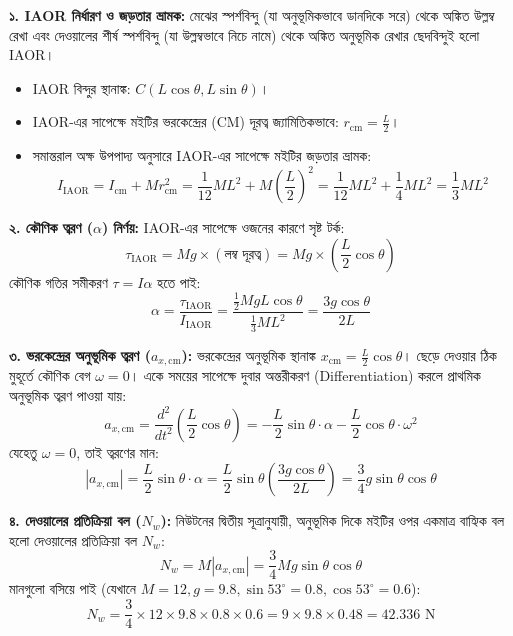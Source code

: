 \documentclass[12pt, a4paper]{article}
\begin{document}
{\begin{tcolorbox}[solutionbox={সমাধান (Solution)}]
\vspace{0.5em}
\textbf{১. IAOR নির্ধারণ ও জড়তার ভ্রামক:}
মেঝের স্পর্শবিন্দু (যা অনুভূমিকভাবে ডানদিকে সরে) থেকে অঙ্কিত উল্লম্ব রেখা এবং দেওয়ালের শীর্ষ স্পর্শবিন্দু (যা উল্লম্বভাবে নিচে নামে) থেকে অঙ্কিত অনুভূমিক রেখার ছেদবিন্দুই হলো IAOR।
\begin{itemize}[leftmargin=1.5em, itemsep=0.2em]
    \item IAOR বিন্দুর স্থানাঙ্ক: $C(L \cos\theta, L \sin\theta)$।
    \item IAOR-এর সাপেক্ষে মইটির ভরকেন্দ্রের (CM) দূরত্ব জ্যামিতিকভাবে: $r_{\text{cm}} = \frac{L}{2}$।
    \item সমান্তরাল অক্ষ উপপাদ্য অনুসারে IAOR-এর সাপেক্ষে মইটির জড়তার ভ্রামক:
    $$I_{\text{IAOR}} = I_{\text{cm}} + M r_{\text{cm}}^2 = \frac{1}{12} M L^2 + M \left(\frac{L}{2}\right)^2 = \frac{1}{12} M L^2 + \frac{1}{4} M L^2 = \frac{1}{3} M L^2$$
\end{itemize}

\vspace{0.5em}
\textbf{২. কৌণিক ত্বরণ ($\alpha$) নির্ণয়:}
IAOR-এর সাপেক্ষে ওজনের কারণে সৃষ্ট টর্ক:
$$\tau_{\text{IAOR}} = M g \times \left(\text{লম্ব দূরত্ব}\right) = M g \times \left(\frac{L}{2} \cos\theta\right)$$
কৌণিক গতির সমীকরণ $\tau = I \alpha$ হতে পাই:
$$\alpha = \frac{\tau_{\text{IAOR}}}{I_{\text{IAOR}}} = \frac{\frac{1}{2} M g L \cos\theta}{\frac{1}{3} M L^2} = \frac{3 g \cos\theta}{2 L}$$

\vspace{0.5em}
\textbf{৩. ভরকেন্দ্রের অনুভূমিক ত্বরণ ($a_{x, \text{cm}}$):}
ভরকেন্দ্রের অনুভূমিক স্থানাঙ্ক $x_{\text{cm}} = \frac{L}{2} \cos\theta$। 
ছেড়ে দেওয়ার ঠিক মুহূর্তে কৌণিক বেগ $\omega = 0$। একে সময়ের সাপেক্ষে দুবার অন্তরীকরণ (Differentiation) করলে প্রাথমিক অনুভূমিক ত্বরণ পাওয়া যায়:
$$a_{x, \text{cm}} = \frac{d^2}{dt^2}\left(\frac{L}{2} \cos\theta\right) = -\frac{L}{2} \sin\theta \cdot \alpha - \frac{L}{2} \cos\theta \cdot \omega^2$$
যেহেতু $\omega = 0$, তাই ত্বরণের মান:
$$|a_{x, \text{cm}}| = \frac{L}{2} \sin\theta \cdot \alpha = \frac{L}{2} \sin\theta \left(\frac{3 g \cos\theta}{2 L}\right) = \frac{3}{4} g \sin\theta \cos\theta$$

\vspace{0.5em}
\textbf{৪. দেওয়ালের প্রতিক্রিয়া বল ($N_w$):}
নিউটনের দ্বিতীয় সূত্রানুযায়ী, অনুভূমিক দিকে মইটির ওপর একমাত্র বাহ্যিক বল হলো দেওয়ালের প্রতিক্রিয়া বল $N_w$:
$$N_w = M |a_{x, \text{cm}}| = \frac{3}{4} M g \sin\theta \cos\theta$$
মানগুলো বসিয়ে পাই (যেখানে $M=12, g=9.8, \sin 53^\circ=0.8, \cos 53^\circ=0.6$):
$$N_w = \frac{3}{4} \times 12 \times 9.8 \times 0.8 \times 0.6 = 9 \times 9.8 \times 0.48 = 42.336\text{ N}$$


\end{tcolorbox}}
\end{document}
